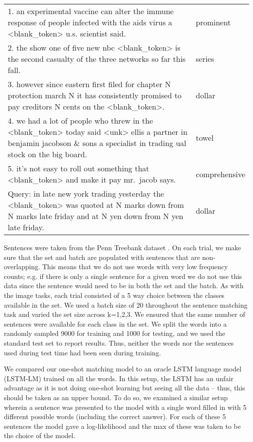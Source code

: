 \begin{tiny}
\begin{tt}
\begin{tabular}{|p{}|p{}}
1. an experimental vaccine can alter the immune response of people infected with the aids virus a <blank\_token> u.s. scientist said.   
&  prominent \\
2. the show one of five new nbc <blank\_token> is the second casualty of the three networks so far this fall.     
& series \\
3. however since eastern first filed for chapter N protection march N it has consistently promised to pay creditors N cents on the <blank\_token>.
& dollar \\
4. we had a lot of people who threw in the <blank\_token> today said <unk> ellis a partner in benjamin jacobson \& sons a specialist in trading ual stock on the big board. 
& towel \\
5. it's not easy to roll out something that <blank\_token> and make it pay mr.~jacob says.
& comprehensive \\
\hline
Query: in late new york trading yesterday the <blank\_token> was quoted at N marks down from N marks late friday and at N yen down from N yen late friday. 
& dollar \\
\end{tabular}
\end{tt}
\end{tiny}

Sentences were taken from the Penn Treebank dataset \cite{marcus1993building}.  On each trial, we make sure that the set and batch are populated with sentences that are non-overlapping.  This means that we do not use words with very low frequency counts; e.g. if there is only a single sentence for a given word we do not use this data since the sentence would need to be in both the set and the batch.  As with the image tasks, each trial consisted of a 5 way choice between the classes available in the set.  We used a batch size of 20 throughout the sentence matching task and varied the set size across k=1,2,3.  We ensured that the same number of sentences were available for each class in the set. We split the words into a randomly sampled 9000 for training and 1000 for testing, and we used the standard test set to report results. Thus, neither the words nor the sentences used during test time had been seen during training.

We compared our one-shot matching model to an oracle LSTM language model (LSTM-LM) \cite{zaremba2014recurrent} trained on all the words. In this setup, the LSTM has an unfair advantage as it is not doing one-shot learning but seeing all the data -- thus, this should be taken as an upper bound.  To do so, we examined a similar setup wherein a sentence was presented to the model with a single word filled in with 5 different possible words (including the correct answer).  For each of these 5 sentences the model gave a log-likelihood and the max of these was taken to be the choice of the model.

